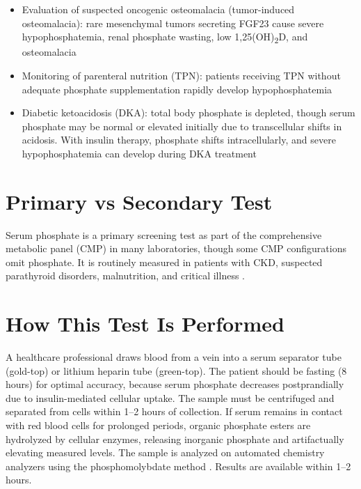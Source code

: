 \begin{itemize}
  \item Evaluation of suspected oncogenic osteomalacia (tumor-induced osteomalacia): rare mesenchymal tumors secreting FGF23 cause severe hypophosphatemia, renal phosphate wasting, low 1,25(OH)\textsubscript{2}D, and osteomalacia
  \item Monitoring of parenteral nutrition (TPN): patients receiving TPN without adequate phosphate supplementation rapidly develop hypophosphatemia
  \item Diabetic ketoacidosis (DKA): total body phosphate is depleted, though serum phosphate may be normal or elevated initially due to transcellular shifts in acidosis. With insulin therapy, phosphate shifts intracellularly, and severe hypophosphatemia can develop during DKA treatment
\end{itemize}

\section*{Primary vs Secondary Test}
Serum phosphate is a primary screening test as part of the comprehensive metabolic panel (CMP) in many laboratories, though some CMP configurations omit phosphate. It is routinely measured in patients with CKD, suspected parathyroid disorders, malnutrition, and critical illness \cite{tierney2023current}.

\section*{How This Test Is Performed}
A healthcare professional draws blood from a vein into a serum separator tube (gold-top) or lithium heparin tube (green-top). The patient should be fasting (8 hours) for optimal accuracy, because serum phosphate decreases postprandially due to insulin-mediated cellular uptake. The sample must be centrifuged and separated from cells within 1--2 hours of collection. If serum remains in contact with red blood cells for prolonged periods, organic phosphate esters are hydrolyzed by cellular enzymes, releasing inorganic phosphate and artifactually elevating measured levels. The sample is analyzed on automated chemistry analyzers using the phosphomolybdate method \cite{fischbach2023manual}. Results are available within 1--2 hours.

